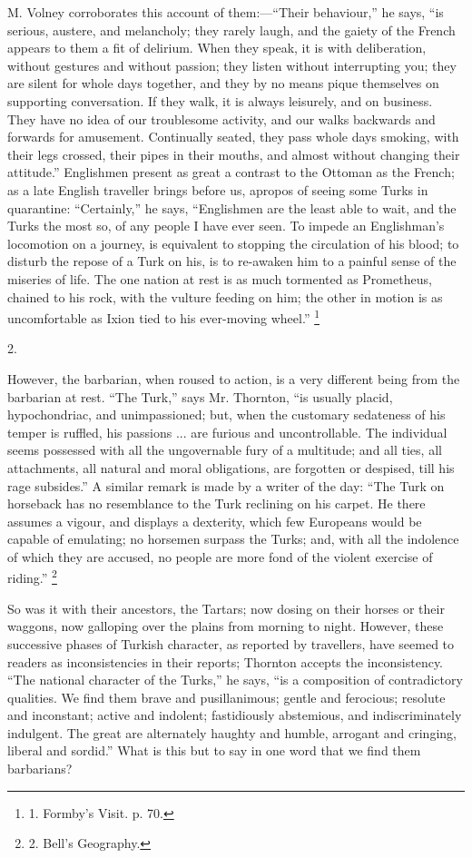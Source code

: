M. Volney corroborates this
account of them:—``Their behaviour,'' he says, ``is serious, austere,
and melancholy; they rarely laugh, and the gaiety of the French
appears to them a fit of delirium. When they speak, it is with
deliberation, without gestures and without passion; they listen
without interrupting you; they are silent for whole days together, and
they by no means pique themselves on supporting conversation. If they
walk, it is always leisurely, and on business. They have no idea
of our troublesome activity, and our walks backwards and forwards for
amusement. Continually seated, they pass whole days smoking, with
their legs crossed, their pipes in their mouths, and almost without
changing their attitude.'' Englishmen present as great a contrast to
the Ottoman as the French; as a late English traveller brings before
us, apropos of seeing some Turks in quarantine: ``Certainly,'' he says, ``Englishmen
are the least able to wait, and the Turks the most so, of any people I
have ever seen. To impede an Englishman's locomotion on a journey, is
equivalent to stopping the circulation of his blood; to disturb the
repose of a Turk on his, is to re-awaken him to a painful sense of the
miseries of life. The one nation at rest is as much tormented as
Prometheus, chained to his rock, with the vulture feeding on him; the
other in motion is as uncomfortable as Ixion tied to his ever-moving
wheel.'' \footnote{1. Formby's Visit. p. 70.}

2.

However, the barbarian, when
roused to action, is a very different being from the barbarian at
rest. ``The Turk,'' says Mr. Thornton, ``is usually placid,
hypochondriac, and unimpassioned; but, when the customary sedateness
of his temper is ruffled, his passions ... are furious and
uncontrollable. The individual seems possessed with all the
ungovernable fury of a multitude; and all ties, all attachments, all
natural and moral obligations, are forgotten or despised, till his
rage subsides.'' A similar remark is made by a writer of the day: ``The
Turk on horseback has no resemblance to the Turk reclining on his
carpet. He there assumes a vigour, and displays a dexterity,
which few Europeans would be capable of emulating; no horsemen surpass
the Turks; and, with all the indolence of which they are accused, no
people are more fond of the violent exercise of riding.'' \footnote{2.
Bell's Geography.}

So was it with their
ancestors, the Tartars; now dosing on their horses or their waggons,
now galloping over the plains from morning to night. However, these
successive phases of Turkish character, as reported by travellers,
have seemed to readers as inconsistencies in their reports; Thornton
accepts the inconsistency. ``The national character of the Turks,'' he
says, ``is a composition of contradictory qualities. We find them brave
and pusillanimous; gentle and ferocious; resolute and inconstant;
active and indolent; fastidiously abstemious, and indiscriminately
indulgent. The great are alternately haughty and humble, arrogant and
cringing, liberal and sordid.'' What is this but to say in one word
that we find them barbarians?

